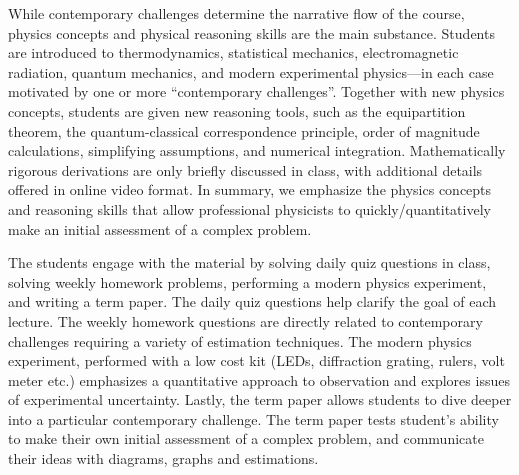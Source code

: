 \documentclass[english,aps,pra,reprint,noshowpacs,superscriptaddress]{revtex4-1}
\begin{document}
While contemporary challenges determine the narrative flow of the
course, physics concepts and physical reasoning skills are the main
substance. Students are introduced to thermodynamics, statistical
mechanics, electromagnetic radiation, quantum mechanics, and modern
experimental physics---in each case motivated by one or more
``contemporary challenges''. Together with new physics concepts,
students are given new reasoning tools, such as the equipartition
theorem, the quantum-classical correspondence principle, order of
magnitude calculations, simplifying assumptions, and numerical
integration. Mathematically rigorous derivations are only briefly
discussed in class, with additional details offered in online video
format. In summary, we emphasize the physics concepts and reasoning
skills that allow professional physicists to quickly/quantitatively
make an initial assessment of a complex problem.

The students engage with the material by solving daily quiz questions
in class, solving weekly homework problems, performing a modern
physics experiment, and writing a term paper. The daily quiz questions
help clarify the goal of each lecture. The weekly homework questions
are directly related to contemporary challenges requiring a variety
of estimation techniques. The modern physics experiment, performed
with a low cost kit (LEDs, diffraction grating, rulers, volt meter
etc.) emphasizes a quantitative approach to observation and explores
issues of experimental uncertainty. Lastly, the term paper allows
students to dive deeper into a particular contemporary challenge. The
term paper tests student's ability to make their own initial
assessment of a complex problem, and communicate their ideas with
diagrams, graphs and estimations.


\end{document}
